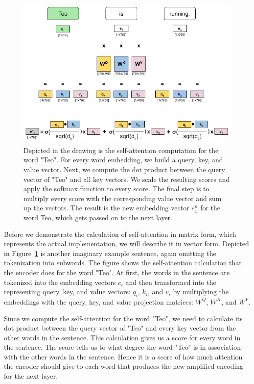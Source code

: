 \begin{figure}[htbp]
\centering
\includegraphics[width=1\textwidth]{images/illustrations/bert_self_attention_calculation.png}
\caption{Depicted in the drawing is the self-attention computation for the word "Teo". For every word embedding, we build a query, key, and value vector. Next, we compute the dot product between the query vector of "Teo" and all key vectors. We scale the resulting scores and apply the softmax function to every score. The final step is to multiply every score with the corresponding value vector and sum up the vectors. The result is the new embedding vector $e^n_1$ for the word Teo, which gets passed on to the next layer.}
\label{fig:bert_self_attention_calc}
\end{figure}

Before we demonstrate the calculation of self-attention in matrix form, which represents the actual implementation, we will describe it in vector form. Depicted in Figure~\ref{fig:bert_self_attention_calc} is another imaginary example sentence, again omitting the tokenization into subwords. The figure shows the self-attention calculation that the encoder does for the word "Teo". At first, the words in the sentence are tokenized into the embedding vectors $e_i$ and then transformed into the representing query, key, and value vectors: $q_i$, $k_i$, and $v_i$ by multiplying the embeddings with the query, key, and value projection matrices: $W^Q$, $W^K$, and $W^V$. 

Since we compute the self-attention for the word "Teo", we need to calculate its dot product between the query vector of "Teo" and every key vector from the other words in the sentence. This calculation gives us a score for every word in the sentence. The score tells us to what degree the word "Teo" is in association with the other words in the sentence. Hence it is a score of how much attention the encoder should give to each word that produces the new amplified encoding for the next layer.

